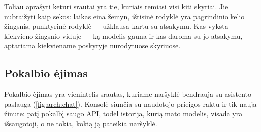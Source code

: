 Toliau aprašyti keturi srautai yra tie, kuriais remiasi visi kiti skyriai. Jie nubraižyti kaip
sekos: laikas eina žemyn, ištisinė rodyklė yra pagrindinio kelio žingsnis, punktyrinė rodyklė
--- užklausa kartu su atsakymu. Kas vyksta kiekvieno žingsnio viduje --- ką modelis gauna ir
kas daroma su jo atsakymu, --- aptariama kiekviename poskyryje nurodytuose skyriuose.

\subsection{Pokalbio ėjimas}

Pokalbio ėjimas yra vienintelis srautas, kuriame naršyklė bendrauja su asistento paslauga
(\cref{fig:arch:chat}). Konsolė siunčia  su naudotojo
prieigos raktu ir tik nauja žinute: patį pokalbį saugo API, todėl istorija, kurią mato
modelis, visada yra išsaugotoji, o ne tokia, kokią ją pateikia naršyklė.

